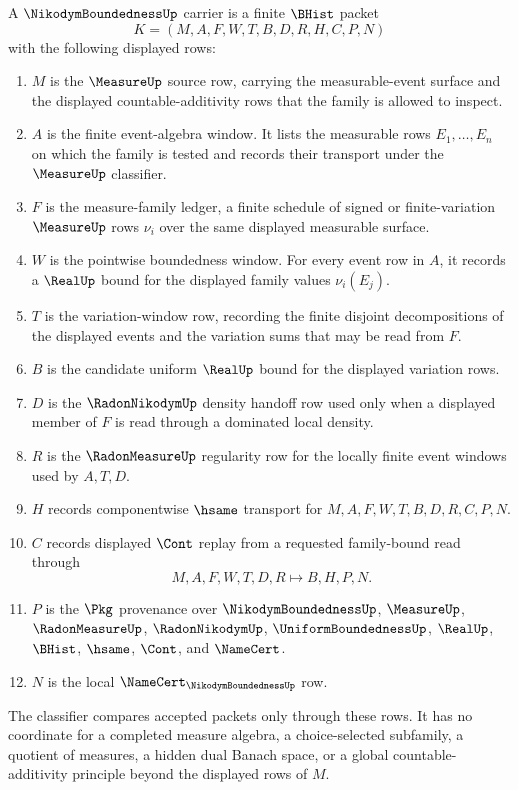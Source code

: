 \begin{definition}
\label{def:nikodym-boundedness-carrier}
A $\NikodymBoundednessUp$ carrier is a finite $\BHist$ packet
$$
K=(M,A,F,W,T,B,D,R,H,C,P,N)
$$
with the following displayed rows:
\begin{enumerate}
\item $M$ is the $\MeasureUp$ source row, carrying the measurable-event surface and the displayed countable-additivity rows that the family is allowed to inspect.
\item $A$ is the finite event-algebra window. It lists the measurable rows $E_1,\ldots,E_n$ on which the family is tested and records their transport under the $\MeasureUp$ classifier.
\item $F$ is the measure-family ledger, a finite schedule of signed or finite-variation $\MeasureUp$ rows $\nu_i$ over the same displayed measurable surface.
\item $W$ is the pointwise boundedness window. For every event row in $A$, it records a $\RealUp$ bound for the displayed family values $\nu_i(E_j)$.
\item $T$ is the variation-window row, recording the finite disjoint decompositions of the displayed events and the variation sums that may be read from $F$.
\item $B$ is the candidate uniform $\RealUp$ bound for the displayed variation rows.
\item $D$ is the $\RadonNikodymUp$ density handoff row used only when a displayed member of $F$ is read through a dominated local density.
\item $R$ is the $\RadonMeasureUp$ regularity row for the locally finite event windows used by $A,T,D$.
\item $H$ records componentwise $\hsame$ transport for $M,A,F,W,T,B,D,R,C,P,N$.
\item $C$ records displayed $\Cont$ replay from a requested family-bound read through
$$
M,A,F,W,T,D,R \longmapsto B,H,P,N .
$$
\item $P$ is the $\Pkg$ provenance over $\NikodymBoundednessUp$, $\MeasureUp$, $\RadonMeasureUp$, $\RadonNikodymUp$, $\UniformBoundednessUp$, $\RealUp$, $\BHist$, $\hsame$, $\Cont$, and $\NameCert$.
\item $N$ is the local $\NameCert_{\NikodymBoundednessUp}$ row.
\end{enumerate}
The classifier compares accepted packets only through these rows. It has no coordinate for a completed measure algebra, a choice-selected subfamily, a quotient of measures, a hidden dual Banach space, or a global countable-additivity principle beyond the displayed rows of $M$.
\end{definition}

